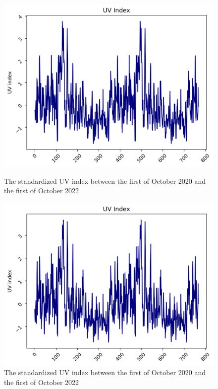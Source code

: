 \begin{figure}
\begin{minipage}{.5\textwidth}
  \centering
  \includegraphics[width=\linewidth]{pics/uv_index_NL.png}
  \caption{The standardized UV index between the first of October 2020 and the first of October 2022}
  \label{fig:UV index NL}
\end{minipage}
\begin{minipage}{.5\textwidth}
  \centering
  \includegraphics[width=\linewidth]{pics/uv_index_DE.png}
  \caption{The standardized UV index between the first of October 2020 and the first of October 2022}
  \label{fig:UV index DE}
\end{minipage}
\end{figure}

